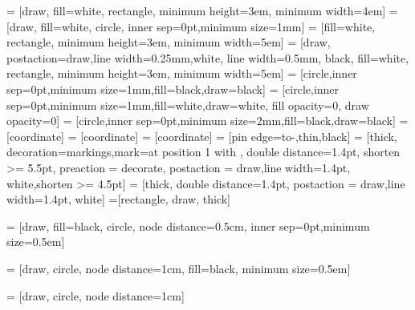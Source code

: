  = [draw, fill=white, rectangle, minimum height=3em, minimum width=4em]
 = [draw, fill=white, circle, inner sep=0pt,minimum size=1mm]
 = [fill=white, rectangle, minimum height=3em, minimum width=5em]
 = [draw, postaction={draw,line width=0.25mm,white}, line width=0.5mm, black, fill=white, rectangle, minimum height=3em, minimum width=5em]
 = [circle,inner sep=0pt,minimum size=1mm,fill=black,draw=black]
 = [circle,inner sep=0pt,minimum size=1mm,fill=white,draw=white, fill opacity=0, draw opacity=0]
 = [circle,inner sep=0pt,minimum size=2mm,fill=black,draw=black]
 = [coordinate]
 = [coordinate] 
 = [coordinate] 
 = [pin edge={to-,thin,black}] 
 = [thick, decoration={markings,mark=at position
   1 with {}},
   double distance=1.4pt, shorten >= 5.5pt,
   preaction = {decorate},
   postaction = {draw,line width=1.4pt, white,shorten >= 4.5pt}]
 = [thick,
   double distance=1.4pt,
   postaction = {draw,line width=1.4pt, white}]
=[rectangle, draw, thick]

 = [draw, fill=black, circle, node distance=0.5cm, inner sep=0pt,minimum size=0.5em]

 = [draw, circle, node distance=1cm, fill=black, minimum size=0.5em]

 = [draw, circle, node distance=1cm]